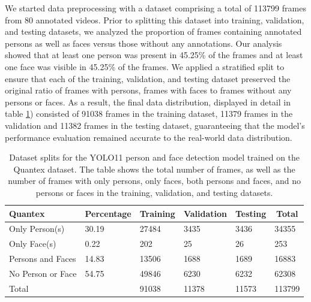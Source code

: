 \documentclass[
  man,floatsintext]{apa6}
\begin{document}
We started data preprocessing with a dataset comprising a total of 113799 frames from 80 annotated videos. Prior to splitting this dataset into training, validation, and testing datasets, we analyzed the proportion of frames containing annotated persons as well as faces versus those without any annotations. Our analysis showed that at least one person was present in 45.25\% of the frames and at least one face was visible in 45.25\% of the frames. We applied a stratified split to ensure that each of the training, validation, and testing dataset preserved the original ratio of frames with persons, frames with faces to frames without any persons or faces. As a result, the final data distribution, displayed in detail in table \ref{tab:person-dataset-splits}) consisted of 91038 frames in the training dataset, 11379 frames in the validation and 11382 frames in the testing dataset, guaranteeing that the model's performance evaluation remained accurate to the real-world data distribution.

\begin{table}[tbp]

\begin{center}
\begin{threeparttable}

\caption{\label{tab:person-dataset-splits}Dataset splits for the YOLO11 person and face detection model trained on the Quantex dataset. The table shows the total number of frames, as well as the number of frames with only persons, only faces, both persons and faces, and no persons or faces in the training, validation, and testing datasets.}

\begin{tabular}{llllll}
\toprule
Quantex & \multicolumn{1}{c}{Percentage} & \multicolumn{1}{c}{Training} & \multicolumn{1}{c}{Validation} & \multicolumn{1}{c}{Testing} & \multicolumn{1}{c}{Total}\\
\midrule
Only Person(s) & 30.19 & 27484 & 3435 & 3436 & 34355\\
Only Face(s) & 0.22 & 202 & 25 & 26 & 253\\
Persons and Faces & 14.83 & 13506 & 1688 & 1689 & 16883\\
No Person or Face & 54.75 & 49846 & 6230 & 6232 & 62308\\
Total &  & 91038 & 11378 & 11573 & 113799\\
\bottomrule
\end{tabular}

\end{threeparttable}
\end{center}

\end{table}
\end{document}
